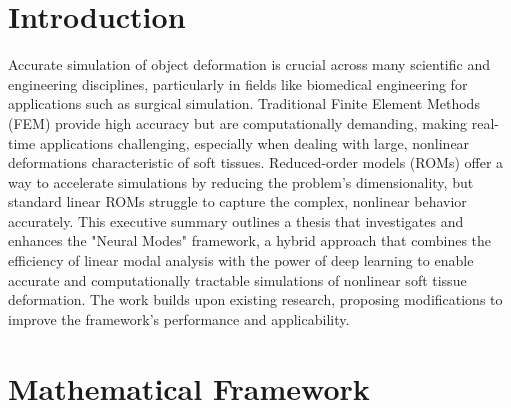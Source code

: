 \documentclass[11pt,a4paper,twocolumn]{article}
\begin{document}




\section{Introduction}
\label{sec:es:introduction}

Accurate simulation of object deformation is crucial across many scientific and engineering disciplines, particularly in fields like biomedical engineering for applications such as surgical simulation. Traditional Finite Element Methods (FEM) provide high accuracy but are computationally demanding, making real-time applications challenging, especially when dealing with large, nonlinear deformations characteristic of soft tissues. Reduced-order models (ROMs) offer a way to accelerate simulations by reducing the problem's dimensionality, but standard linear ROMs struggle to capture the complex, nonlinear behavior accurately. This executive summary outlines a thesis that investigates and enhances the "Neural Modes" framework, a hybrid approach that combines the efficiency of linear modal analysis with the power of deep learning to enable accurate and computationally tractable simulations of nonlinear soft tissue deformation. The work builds upon existing research, proposing modifications to improve the framework's performance and applicability.

\section{Mathematical Framework}
\label{sec:es:mathematical_framework}
\end{document}
